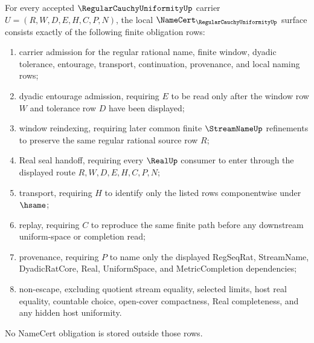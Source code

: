 \begin{theorem}
\label{thm:regular-cauchy-uniformity-namecert-obligations}
For every accepted $\RegularCauchyUniformityUp$ carrier $U=(R,W,D,E,H,C,P,N)$, the local $\NameCert_{\RegularCauchyUniformityUp}$ surface consists exactly of the following finite obligation rows:
\begin{enumerate}
\item carrier admission for the regular rational name, finite window, dyadic tolerance, entourage, transport, continuation, provenance, and local naming rows;
\item dyadic entourage admission, requiring $E$ to be read only after the window row $W$ and tolerance row $D$ have been displayed;
\item window reindexing, requiring later common finite $\StreamNameUp$ refinements to preserve the same regular rational source row $R$;
\item Real seal handoff, requiring every $\RealUp$ consumer to enter through the displayed route $R,W,D,E,H,C,P,N$;
\item transport, requiring $H$ to identify only the listed rows componentwise under $\hsame$;
\item replay, requiring $C$ to reproduce the same finite path before any downstream uniform-space or completion read;
\item provenance, requiring $P$ to name only the displayed RegSeqRat, StreamName, DyadicRatCore, Real, UniformSpace, and MetricCompletion dependencies;
\item non-escape, excluding quotient stream equality, selected limits, host real equality, countable choice, open-cover compactness, Real completeness, and any hidden host uniformity.
\end{enumerate}
No NameCert obligation is stored outside those rows.
\end{theorem}
